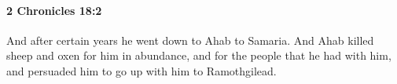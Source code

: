 
		\paragraph{2 Chronicles 18:2} %
			\label{2CHRONICLES-18-2}

			And after certain years he went down to Ahab to Samaria. And Ahab killed sheep and oxen for him in abundance, and for the people that he had with him, and persuaded him to go up with him to Ramothgilead.


